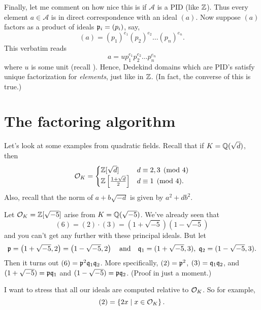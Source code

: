 Finally, let me comment on how nice this is if $\mathcal A$ is a PID (like $\mathbb Z$).
Thus every element $a \in \mathcal A$ is in direct correspondence with an ideal $(a)$.
Now suppose $(a)$ factors as a product of ideals $\mathfrak p_i = (p_i)$, say,
\[ (a) = (p_1)^{e_1} (p_2)^{e_2} \dots (p_n)^{e_n} . \]
This verbatim reads \[ a = u p_1^{e_1} p_2^{e_2} \dots p_n^{e_n} \]
where $u$ is some unit (recall ).
Hence, Dedekind domains which are PID's satisfy unique factorization
for \emph{elements}, just like in $\mathbb Z$.
(In fact, the converse of this is true.)

\section{The factoring algorithm}
Let's look at some examples from quadratic fields.
Recall that if $K = \mathbb Q(\sqrt{d})$, then
\[
	\mathcal O_K =
	\begin{cases}
		\mathbb Z[\sqrt d] & d \equiv 2,3 \pmod 4 \\
		\mathbb Z\left[ \frac{1+\sqrt d}{2} \right] & d \equiv 1 \pmod 4.
	\end{cases}
\]
Also, recall that the norm of $a+b\sqrt{-d}$ is given by $a^2+db^2$.


\begin{example}
	Let $\mathcal O_K = \mathbb Z[\sqrt{-5}]$ arise from $K = \mathbb Q(\sqrt{-5})$.
	We've already seen that
	\[ (6) = (2) \cdot (3) = \left( 1+\sqrt{-5} \right)\left( 1-\sqrt{-5} \right) \]
	and you can't get any further with these principal ideals.
	But let
	\[ \mathfrak p = \left( 1+\sqrt{-5}, 2 \right) = \left( 1-\sqrt{-5}, 2 \right)
		\quad\text{and}\quad \mathfrak q_1 = (1+\sqrt{-5},3),
		\; \mathfrak q_2 = (1-\sqrt{-5},3). \]
	Then it turns out $(6) = \mathfrak p^2\mathfrak q_1\mathfrak q_2$.
	More specifically, $(2) = \mathfrak p^2$, $(3) = \mathfrak q_1\mathfrak q_2$,
	and $(1+\sqrt{-5}) = \mathfrak p\mathfrak q_1$ and $(1-\sqrt{-5}) = \mathfrak p\mathfrak q_2$.
	(Proof in just a moment.)
\end{example}
I want to stress that all our ideals are computed relative to $\mathcal O_K$.
So for example, \[ (2) = \left\{ 2x \mid x \in \mathcal O_K \right\}. \]

